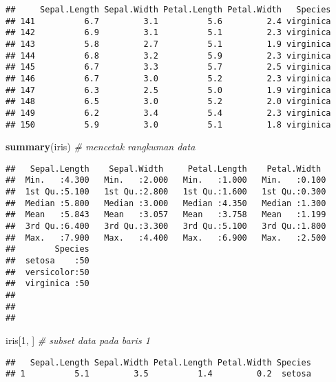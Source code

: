 \documentclass[]{article}
\newenvironment{Shaded}{\begin{snugshade}}{\end{snugshade}}
\newcommand{\KeywordTok}[1]{\textcolor[rgb]{0.13,0.29,0.53}{\textbf{#1}}}
\newcommand{\DecValTok}[1]{\textcolor[rgb]{0.00,0.00,0.81}{#1}}
\newcommand{\CommentTok}[1]{\textcolor[rgb]{0.56,0.35,0.01}{\textit{#1}}}
\newcommand{\NormalTok}[1]{#1}
\begin{document}
\begin{verbatim}
##     Sepal.Length Sepal.Width Petal.Length Petal.Width   Species
## 141          6.7         3.1          5.6         2.4 virginica
## 142          6.9         3.1          5.1         2.3 virginica
## 143          5.8         2.7          5.1         1.9 virginica
## 144          6.8         3.2          5.9         2.3 virginica
## 145          6.7         3.3          5.7         2.5 virginica
## 146          6.7         3.0          5.2         2.3 virginica
## 147          6.3         2.5          5.0         1.9 virginica
## 148          6.5         3.0          5.2         2.0 virginica
## 149          6.2         3.4          5.4         2.3 virginica
## 150          5.9         3.0          5.1         1.8 virginica
\end{verbatim}

\begin{Shaded}
\begin{Highlighting}[]
\KeywordTok{summary}\NormalTok{(iris) }\CommentTok{# mencetak rangkuman data}
\end{Highlighting}
\end{Shaded}

\begin{verbatim}
##   Sepal.Length    Sepal.Width     Petal.Length    Petal.Width   
##  Min.   :4.300   Min.   :2.000   Min.   :1.000   Min.   :0.100  
##  1st Qu.:5.100   1st Qu.:2.800   1st Qu.:1.600   1st Qu.:0.300  
##  Median :5.800   Median :3.000   Median :4.350   Median :1.300  
##  Mean   :5.843   Mean   :3.057   Mean   :3.758   Mean   :1.199  
##  3rd Qu.:6.400   3rd Qu.:3.300   3rd Qu.:5.100   3rd Qu.:1.800  
##  Max.   :7.900   Max.   :4.400   Max.   :6.900   Max.   :2.500  
##        Species  
##  setosa    :50  
##  versicolor:50  
##  virginica :50  
##                 
##                 
## 
\end{verbatim}

\begin{Shaded}
\begin{Highlighting}[]
\NormalTok{iris[}\DecValTok{1}\NormalTok{, ] }\CommentTok{# subset data pada baris 1}
\end{Highlighting}
\end{Shaded}

\begin{verbatim}
##   Sepal.Length Sepal.Width Petal.Length Petal.Width Species
## 1          5.1         3.5          1.4         0.2  setosa
\end{verbatim}
\end{document}

